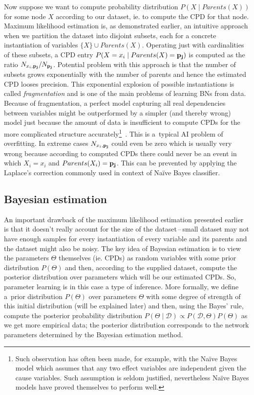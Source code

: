 \documentclass[english,cover]{fitthesis} %
\newcommand{\term}[1]{\emph{#1}}           %
\newcommand{\vars}[1]{{\bold{#1}}}         %
\begin{document}
Now suppose we want to compute probability distribution $P(X \mid Parents(X))$ for some node $X$ according to our dataset, ie. to compute the CPD for that node. Maximum likelihood estimation is, as demonstrated earlier, an intuitive approach when we partition the dataset into disjoint subsets, each for a concrete instantiation of variables $\lbrace X \rbrace \cup Parents(X)$. Operating just with cardinalities of these subsets, a CPD entry $P(X=x_i \mid Parents(X) = \vars{p_j})$ is computed as the ratio $N_{x_i,\vars{p_j}} / N_{\vars{p_j}}$. Potential problem with this approach is that the number of subsets grows exponentially with the number of parents and hence the estimated CPD looses precision. This exponential explosion of possible instantiations is called \term{fragmentation} and is one of the main problems of learning BNs from data. Because of fragmentation, a perfect model capturing all real dependencies between variables might be outperformed by a simpler (and thereby wrong) model just because the amount of data is insufficient to compute CPDs for the more complicated structure accurately\footnote{Such observation has often been made, for example, with the Naïve Bayes model which assumes that any two effect variables are independent given the cause variables. Such assumption is seldom justified, nevertheless Naïve Bayes models have proved themselves to perform well.}~\cite{pgm}. This is a~typical AI problem of overfitting. In extreme cases $N_{x_i,\vars{p_j}}$ could even be zero which is usually very wrong because according to computed CPDs there could never be an event in which $X_i = x_i$ and $Parents(X_i) = \vars{p_j}$. This can be prevented by applying the Laplace's correction commonly used in context of Naïve Bayes classifier.


\subsection{Bayesian estimation}
An important drawback of the maximum likelihood estimation presented earlier is that it doesn't really account for the size of the dataset\,--\,small dataset may not have enough samples for every instantiation of every variable and its parents and the dataset might also be noisy. The key idea of Bayesian estimation is to view the parameters $\Theta$ themselves (ie. CPDs) as random variables with some prior distribution $P(\Theta)$ and then, according to the supplied dataset, compute the posterior distribution over parameters which will be our estimated CPDs. So, parameter learning is in this case a type of inference.
More formally, we define a~prior distribution $P(\Theta)$ over parameters $\Theta$ with some degree of strength of this initial distribution (will be explained later) and then, using the Bayes' rule, compute the posterior probability distribution $P(\Theta \mid \mathcal{D}) \propto P(\mathcal{D},\Theta) P(\Theta)$ as we get more empirical data; the posterior distribution corresponds to the network parameters determined by the Bayesian estimation method.
\end{document}
